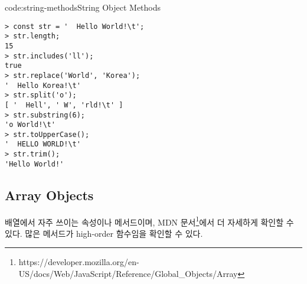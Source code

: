 \begin{codeenv}{code:string-methods}{String Object Methods}\begin{verbatim}
> const str = '  Hello World!\t';
> str.length;
15
> str.includes('ll');
true
> str.replace('World', 'Korea');
'  Hello Korea!\t'
> str.split('o');
[ '  Hell', ' W', 'rld!\t' ]
> str.substring(6);
'o World!\t'
> str.toUpperCase();
'  HELLO WORLD!\t'
> str.trim();
'Hello World!'
\end{verbatim}
\end{codeenv}

\subsection*{Array Objects}

배열에서 자주 쓰이는 속성이나 메서드이며, MDN 문서\footnote{https://developer.mozilla.org/en-US/docs/Web/JavaScript/Reference/Global\_Objects/Array}에서 더 자세하게 확인할 수 있다. 많은 메서드가 high-order 함수임을 확인할 수 있다.

